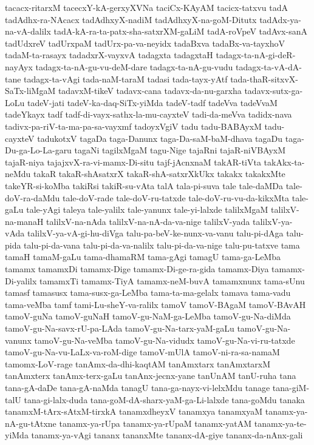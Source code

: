 {tacacx-ritarxM
tacecxY-kA-gerxyXVNa
taciCx-KAyAM
tacicx-tatxvu
tadA
tadAdhx-ra-NAcacx
tadAdhxyX-nadiM
tadAdhxyX-na-goM-Ditutx
tadAdx-ya-na-vA-dalilx
tadA-kA-ra-ta-patx-sha-satxrXM-gaLiM
tadA-roVpeV
tadAvx-sanA
tadUdxreV
tadUrxpaM
tadUrx-pa-va-neyidx
tadaBxva
tadaBx-va-tayxhoV
tadaM-ta-rasayx
tadadxrX-vayxvA
tadagxta
tadagxtaH
tadagx-ta-nA-gi-deR-nayAyx
tadagx-ta-nA-gu-vu-deM-dare
tadagx-ta-nA-gu-vudu
tadagx-ta-vA-dA-tane
tadagx-ta-vAgi
tada-naM-taraM
tadasi
tada-tayx-yAtf
tada-thaR-sitxvX-SaTx-liMgaM
tadavxM-tikeV
tadavx-cana
tadavx-da-nu-garxha
tadavx-sutx-ga-LoLu
tadeV-jati
tadeV-ka-daq-SiTx-yiMda
tadeV-tadf
tadeVva
tadeVvaM
tadeYkayx
tadf
tadf-di-vayx-sathx-la-mu-cayxteV
tadi-da-meVva
tadidx-nava
tadivx-pa-riV-ta-ma-pa-sa-vayxmf
tadoyxVgiV
tadu
tadu-BABAyxM
tadu-cayxteV
tadukotxV
tagaDa
taga-Danunx
taga-Da-saM-baM-dhava
tagaDu
taga-Du-ga-Lo-La-garu
tagaNi
tagilxMgaM
tagu-Nige
tajaRni
tajaR-niVBAyxM
tajaR-niya
tajajxvX-ra-vi-mamx-Di-situ
tajf-jAcnxnaM
takAR-tiVta
takAkx-ta-neMdu
takaR
takaR-shAsatxrX
takaR-shA-satxrXkUkx
takakx
takakxMte
takeYR-si-koMba
takiRsi
takiR-su-vAta
talA
tala-pi-suva
tale
tale-daMDa
tale-doV-ra-daMdu
tale-doV-rade
tale-doV-ru-tatxde
tale-doV-ru-vu-da-kikxMta
tale-gaLu
tale-yAgi
taleya
tale-yalilx
tale-yanunx
tale-yi-lalxde
talilxMgaM
talilxV-na-manaH
talilxV-na-nAda
talilxV-na-nA-da-va-nige
talilxV-yada
talilxV-ya-vAda
talilxV-ya-vA-gi-hu-diVga
talu-pa-beV-ke-nunx-va-vanu
talu-pi-dAga
talu-pida
talu-pi-da-vana
talu-pi-da-va-nalilx
talu-pi-da-va-nige
talu-pu-tatxve
tama
tamaH
tamaM-gaLu
tama-dhamaRM
tama-gAgi
tamagU
tama-ga-LeMba
tamamx
tamamxDi
tamamx-Dige
tamamx-Di-ge-ra-gida
tamamx-Diya
tamamx-Di-yalilx
tamamxTi
tamamx-TiyA
tamamx-neM-buvA
tamamxnunx
tama-sUnu
tamasf
tamasusx
tama-susx-ga-LeMba
tama-ta-ma-gelalx
tamava
tama-vadu
tama-veMba
tamf
tami-Lu-sheY-va-ralilx
tamoV
tamoV-BAgaM
tamoV-BAvAH
tamoV-guNa
tamoV-guNaH
tamoV-gu-NaM-ga-LeMba
tamoV-gu-Na-diMda
tamoV-gu-Na-savx-rU-pa-LAda
tamoV-gu-Na-tarx-yaM-gaLu
tamoV-gu-Na-vanunx
tamoV-gu-Na-veMba
tamoV-gu-Na-vidudx
tamoV-gu-Na-vi-ru-tatxde
tamoV-gu-Na-vu-LaLx-va-roM-dige
tamoV-mUlA
tamoV-ni-ra-sa-namaM
tamomx-LoV-rage
tanAmx-da-dhi-kaqtAM
tanAmxtarx
tanAmxtarxM
tanAmxterx
tanAmx-terx-gaLu
tanAnx-jecnx-yane
tanUnAM
tanU-ruha
tana
tana-gA-daDe
tana-gA-naMda
tanagU
tana-ga-nayx-vi-lelxMdu
tanage
tana-giM-talU
tana-gi-lalx-duda
tana-goM-dA-sharx-yaM-ga-Li-lalxde
tana-goMdu
tanaka
tanamxM-tArx-sAtxM-tirxkA
tanamxdheyxV
tanamxya
tanamxyaM
tanamx-ya-nA-gu-tAtxne
tanamx-ya-rUpa
tanamx-ya-rUpaM
tanamx-yatAM
tanamx-ya-te-yiMda
tanamx-ya-vAgi
tananx
tananxMte
tananx-dA-giye
tananx-da-nAnx-gali
}
